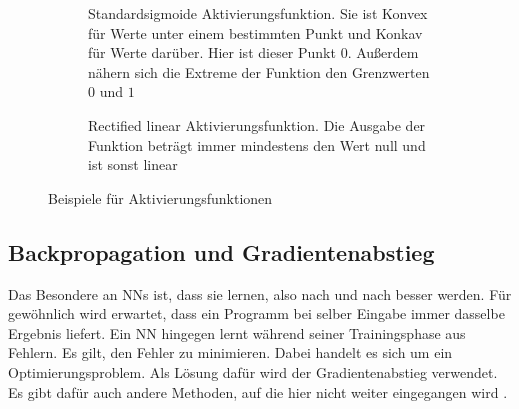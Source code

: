 \begin{figure}
  \centering
  \begin{subfigure}[t]{.49\textwidth}
    \centering
    \caption{Standardsigmoide Aktivierungsfunktion. Sie ist Konvex für Werte unter einem bestimmten Punkt und Konkav für Werte darüber. Hier ist dieser Punkt $0$. Außerdem nähern sich die Extreme der Funktion den Grenzwerten $0$ und $1$}
    \label{fig:sigmoid}
  \end{subfigure}%
  \hfill%
  \begin{subfigure}[t]{.49\textwidth}
    \centering
    \caption{Rectified linear Aktivierungsfunktion. Die Ausgabe der Funktion beträgt immer mindestens den Wert null und ist sonst linear}
    \label{fig:Relu}
  \end{subfigure}
  \caption{Beispiele für Aktivierungsfunktionen}
  \label{fig:activationfunction}
\end{figure}

\subsection{Backpropagation und Gradientenabstieg}
\label{chap:bpGradient}
Das Besondere an \acp{NN} ist, dass sie lernen, also nach und nach besser werden. Für gewöhnlich wird erwartet, dass ein Programm bei selber Eingabe immer dasselbe Ergebnis liefert. Ein \ac{NN} hingegen lernt während seiner Trainingsphase aus Fehlern. Es gilt, den Fehler zu minimieren. Dabei handelt es sich um ein Optimierungsproblem. Als Lösung dafür wird der Gradientenabstieg verwendet. Es gibt dafür auch andere Methoden, auf die hier nicht weiter eingegangen wird \cite{StockfishNNUE}.

